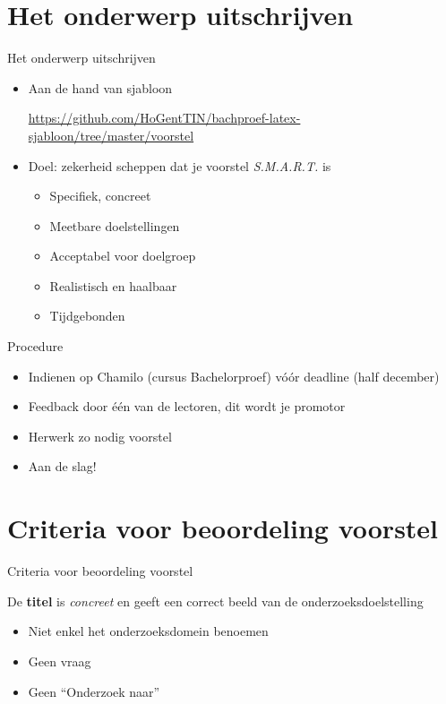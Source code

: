 \documentclass[usenames,dvipsnames]{beamer}
\begin{document}
\section{Het onderwerp uitschrijven}
\sectionframe{}

\begin{frame}{Het onderwerp uitschrijven}

  \begin{itemize}
    \item Aan de hand van sjabloon
    
    \url{https://github.com/HoGentTIN/bachproef-latex-sjabloon/tree/master/voorstel}
    
    \item Doel: zekerheid scheppen dat je voorstel \emph{S.M.A.R.T.} is
    \begin{itemize}
      \item Specifiek, concreet
      \item Meetbare doelstellingen
      \item Acceptabel voor doelgroep
      \item Realistisch en haalbaar
      \item Tijdgebonden
    \end{itemize}
  \end{itemize}
\end{frame}

\begin{frame}{Procedure}

\begin{itemize}
  \item Indienen op Chamilo (cursus Bachelorproef) vóór deadline (half december)
  \item Feedback door één van de lectoren, dit wordt je promotor
  \item Herwerk zo nodig voorstel
  \item Aan de slag!
\end{itemize}
\end{frame}

\section{Criteria voor beoordeling voorstel}
\sectionframe{}

\begin{frame}{Criteria voor beoordeling voorstel}

De \textbf{titel} is \emph{concreet} en geeft een correct beeld van de onderzoeksdoelstelling

\begin{itemize}
  \item Niet enkel het onderzoeksdomein benoemen
  \item Geen vraag
  \item Geen ``Onderzoek naar''
\end{itemize}


%

\end{frame}
\end{document}
